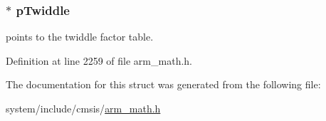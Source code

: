 \subsubsection[{\texorpdfstring{p\+Twiddle}{pTwiddle}}]{$\ast$ p\+Twiddle}\hypertarget{structarm__dct4__instance__f32_aca581481fccdff0f557f54a3ef20d967}{}\label{structarm__dct4__instance__f32_aca581481fccdff0f557f54a3ef20d967}
points to the twiddle factor table. 

Definition at line 2259 of file arm\+\_\+math.\+h.



The documentation for this struct was generated from the following file\+:\begin{DoxyCompactItemize}
\item 
system/include/cmsis/\hyperlink{arm__math_8h}{arm\+\_\+math.\+h}\end{DoxyCompactItemize}
